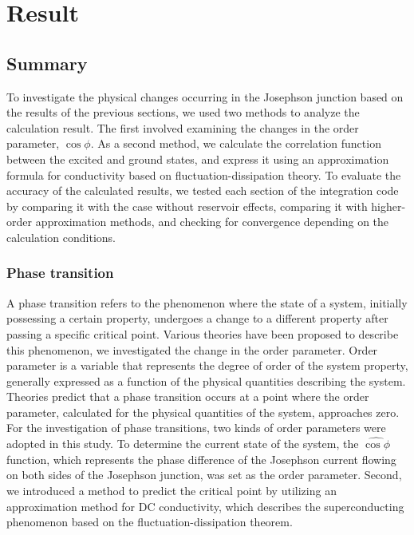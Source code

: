 \documentclass{article}[12pt]
\begin{document}
\section{Result}
\begin{spacing}{1.5}
\subsection{Summary}
  To investigate the physical changes occurring in the Josephson junction based on the results of the previous sections,  
  we used two methods to analyze the calculation result. The first involved examining the changes in the order parameter, $\cos{\phi}$. 
  As a second method, we calculate the correlation function between the excited and ground states, and express it using an approximation formula for conductivity based on fluctuation-dissipation theory. 
  To evaluate the accuracy of the calculated results, 
  we tested each section of the integration code by comparing it with the case without reservoir effects, 
  comparing it with higher-order approximation methods, and checking for convergence depending on the calculation conditions.

  \subsubsection*{Phase transition}
A phase transition refers to the phenomenon where the state of a system, initially possessing a certain property, 
undergoes a change to a different property after passing a specific critical point. Various theories have been 
proposed to describe this phenomenon, we investigated the change in the order parameter. 
Order parameter is a variable that represents the degree of order of the system property, 
generally expressed as a function of the physical quantities describing the system. 
Theories predict that a phase transition occurs at a point where the order parameter, 
calculated for the physical quantities of the system, approaches zero.
For the investigation of phase transitions, two kinds of order parameters were adopted in this study. 
To determine the current state of the system, the $\hat{\cos\phi}$ function, 
which represents the phase difference of the Josephson current flowing on both sides of the Josephson junction, 
was set as the order parameter. Second, we introduced a method to predict 
the critical point by utilizing an approximation method for DC conductivity, 
which describes the superconducting phenomenon based on the fluctuation-dissipation theorem.
\pagebreak

\end{spacing}
\end{document}
